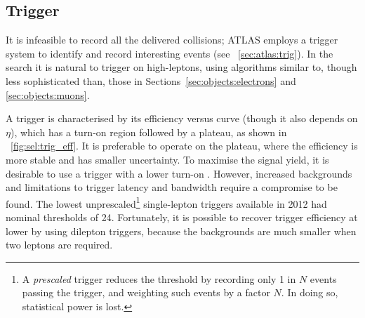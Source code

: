 \subsection{Trigger}
\label{sec:selection:trigger}

It is infeasible to record all the delivered collisions; ATLAS employs a trigger system to 
identify and record interesting events (see \Section~\ref{sec:atlas:trig}). In the \HWWlvlv 
search it is natural to trigger on high-\pt leptons, using algorithms similar to, though 
less sophisticated than, those in Sections~\ref{sec:objects:electrons} and 
\ref{sec:objects:muons}.

A trigger is characterised by its efficiency versus \pt curve (though it also depends on 
$\eta$), which has a turn-on region followed by a plateau, as shown in 
\Figure~\ref{fig:sel:trig_eff}. It is preferable to operate on the plateau, where the 
efficiency is more stable and has smaller uncertainty. To maximise the signal yield, it is 
desirable to use a trigger with a lower turn-on \pt. However, increased backgrounds and 
limitations to trigger latency and bandwidth require a compromise to be found. The lowest 
unprescaled\footnote{
	A \textit{prescaled} trigger reduces the threshold \pt by recording only 1 in $N$ 
	events passing the trigger, and weighting such events by a factor $N$. In doing so, 
	statistical power is lost.
}
single-lepton triggers available in 2012 had nominal \pt thresholds of \unit{24}{\GeV}. 
Fortunately, it is possible to recover trigger efficiency at lower \pt by using dilepton 
triggers, because the backgrounds are much smaller when two leptons are required.

